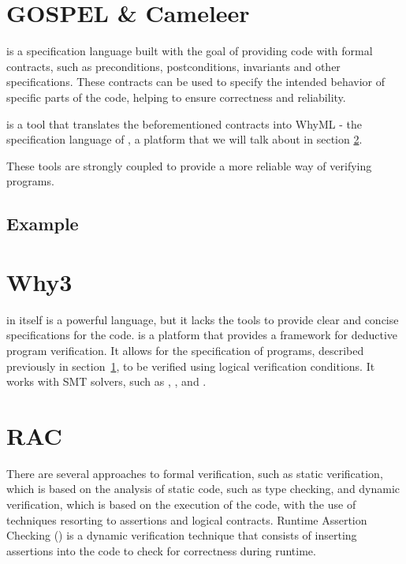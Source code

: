 \section{GOSPEL \& Cameleer}
\label{sec:gospel_and_cameleer}

\gospellang is a specification language built with the goal of providing \ocaml code 
with formal contracts, such as preconditions, postconditions, invariants and other 
specifications. These contracts can be used to specify the intended behavior of 
specific parts of the code, helping to ensure correctness and reliability.

\cameleer is a tool that translates the beforementioned contracts into WhyML - 
the specification language of \why, a platform that we will talk about in 
section \ref{sec:why3}.

These tools are strongly coupled to provide a more reliable way of verifying 
\ocaml programs.

\subsection{Example}
\label{sub:example}


\section{Why3}
\label{sec:why3}

\ocaml in itself is a powerful language, but it lacks the tools to provide clear 
and concise specifications for the code. \why is a platform that provides a framework 
for deductive program verification. It allows for the specification of programs, 
described previously in section~\ref{sec:gospel_and_cameleer}, to be verified using 
logical verification conditions. It works with SMT solvers, such as \zthree, \altergo, 
and \coq.

\section{RAC}
\label{sec:rac}

There are several approaches to formal verification, such as static verification, 
which is based on the analysis of static code, such as type checking, and dynamic 
verification, which is based on the execution of the code, with the use of 
techniques resorting to assertions and logical contracts. Runtime Assertion Checking 
(\rac) is a dynamic verification technique that consists of inserting assertions 
into the code to check for correctness during runtime.


